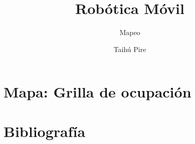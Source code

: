 \documentclass[aspectratio=169,compress]{beamer}
\subtitle{Mapeo}
\title{Robótica Móvil}
\author{Taihú Pire}
\institute{Laboratorio de Robótica}
\date{}
\begin{document}
	
	\frame{\titlepage}
	
	\section{Mapa: Grilla de ocupación}
	
	
	\section{Bibliografía}
	
	
\end{document}
